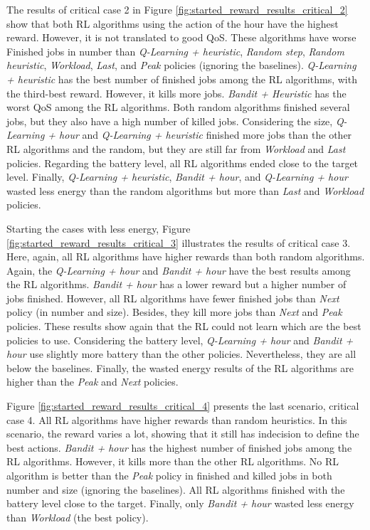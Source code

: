 The results of critical case 2 in Figure \ref{fig:started_reward_results_critical_2} show that both RL algorithms using the action of the hour have the highest reward. However, it is not translated to good QoS. These algorithms have worse Finished jobs in number than \emph{Q-Learning + heuristic}, \emph{Random step}, \emph{Random heuristic}, \emph{Workload}, \emph{Last}, and \emph{Peak} policies (ignoring the baselines). \emph{Q-Learning + heuristic} has the best number of finished jobs among the RL algorithms, with the third-best reward. However, it kills more jobs. \emph{Bandit + Heuristic} has the worst QoS among the RL algorithms. Both random algorithms finished several jobs, but they also have a high number of killed jobs. Considering the size, \emph{Q-Learning + hour} and \emph{Q-Learning + heuristic} finished more jobs than the other RL algorithms and the random, but they are still far from \emph{Workload} and \emph{Last} policies. Regarding the battery level, all RL algorithms ended close to the target level. Finally, \emph{Q-Learning + heuristic}, \emph{Bandit + hour}, and \emph{Q-Learning + hour} wasted less energy than the random algorithms but more than \emph{Last} and \emph{Workload} policies.

Starting the cases with less energy, Figure \ref{fig:started_reward_results_critical_3} illustrates the results of critical case 3. Here, again, all RL algorithms have higher rewards than both random algorithms. Again, the \emph{Q-Learning + hour} and \emph{Bandit + hour} have the best results among the RL algorithms. \emph{Bandit + hour} has a lower reward but a higher number of jobs finished. However, all RL algorithms have fewer finished jobs than \emph{Next} policy (in number and size). Besides, they kill more jobs than \emph{Next} and \emph{Peak} policies. These results show again that the RL could not learn which are the best policies to use. Considering the battery level, \emph{Q-Learning + hour} and \emph{Bandit + hour} use slightly more battery than the other policies. Nevertheless, they are all below the baselines. Finally, the wasted energy results of the RL algorithms are higher than the \emph{Peak} and \emph{Next} policies.

Figure \ref{fig:started_reward_results_critical_4} presents the last scenario, critical case 4. All RL algorithms have higher rewards than random heuristics. In this scenario, the reward varies a lot, showing that it still has indecision to define the best actions. \emph{Bandit + hour} has the highest number of finished jobs among the RL algorithms. However, it kills more than the other RL algorithms. No RL algorithm is better than the \emph{Peak} policy in finished and killed jobs in both number and size (ignoring the baselines). All RL algorithms finished with the battery level close to the target. Finally, only \emph{Bandit + hour} wasted less energy than \emph{Workload} (the best policy).

